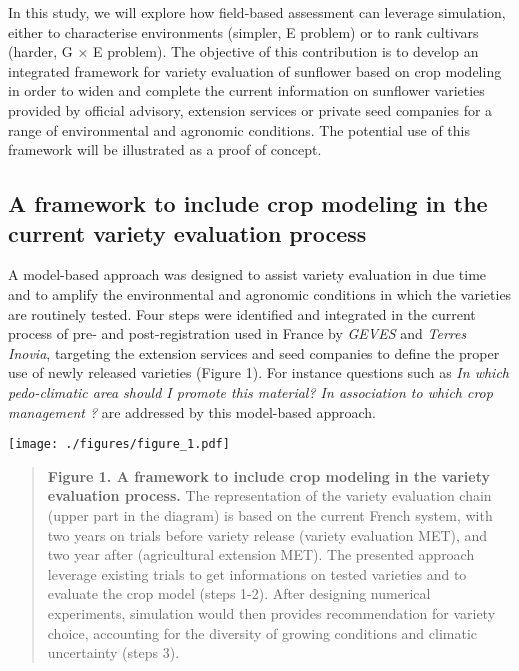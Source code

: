 \documentclass[a4paper]{article}
\begin{document}
In this study, we will explore how field-based assessment can leverage
simulation, either to characterise environments (simpler, E problem) or
to rank cultivars (harder, G \(\times\) E problem). The objective of
this contribution is to develop an integrated framework for variety
evaluation of sunflower based on crop modeling in order to widen and
complete the current information on sunflower varieties provided by
official advisory, extension services or private seed companies for a
range of environmental and agronomic conditions. The potential use of
this framework will be illustrated as a proof of concept.

\subsection{A framework to include crop modeling in the current variety
evaluation
process}\label{a-framework-to-include-crop-modeling-in-the-current-variety-evaluation-process}

A model-based approach was designed to assist variety evaluation in due
time and to amplify the environmental and agronomic conditions in which
the varieties are routinely tested. Four steps were identified and
integrated in the current process of pre- and post-registration used in
France by \emph{GEVES} and \emph{Terres Inovia}, targeting the extension
services and seed companies to define the proper use of newly released
varieties (Figure 1). For instance questions such as \emph{In which
pedo-climatic area should I promote this material? In association to
which crop management ?} are addressed by this model-based approach.

\texttt{[image: ./figures/figure\_1.pdf]}

\begin{quote}
\textbf{Figure 1. A framework to include crop modeling in the variety
evaluation process.} The representation of the variety evaluation chain
(upper part in the diagram) is based on the current French system, with
two years on trials before variety release (variety evaluation MET), and
two year after (agricultural extension MET). The presented approach
leverage existing trials to get informations on tested varieties and to
evaluate the crop model (steps 1-2). After designing numerical
experiments, simulation would then provides recommendation for variety
choice, accounting for the diversity of growing conditions and climatic
uncertainty (steps 3).
\end{quote}
\end{document}
